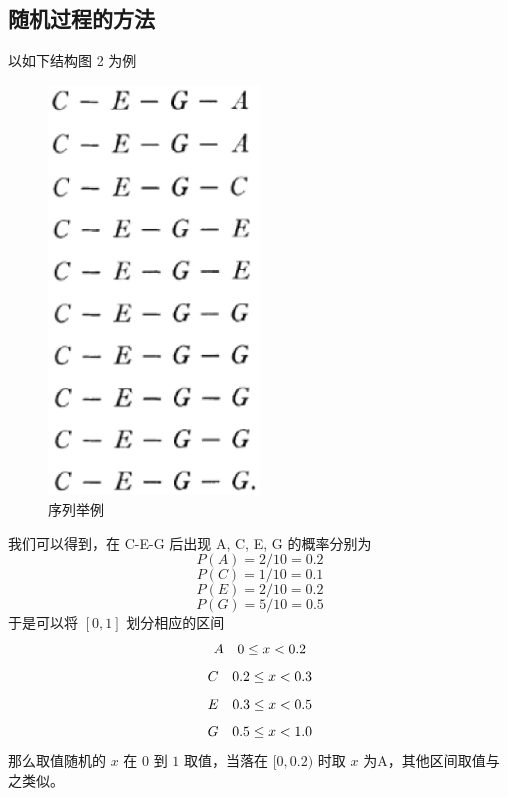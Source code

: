 \documentclass[11pt]{article}
\def\quad{\hskip1em\relax}
\begin{document}
\subsection{随机过程的方法}
以如下结构图 2 为例
\begin{figure}[hptb]
	\centering
	\label{fig:1.1.2}
	\includegraphics[width=0.5\textwidth]{pic/1.1.2.eps}
	\caption{序列举例}
\end{figure}	
我们可以得到，在 C-E-G 后出现 A, C, E, G 的概率分别为
$$ P(A) = 2/10 = 0.2 $$
$$ P(C) = 1/10 = 0.1 $$
$$ P(E) = 2/10 = 0.2 $$
$$ P(G) = 5/10 = 0.5 $$
于是可以将 $[0, 1]$ 划分相应的区间
$$ A \quad 0 \le x < 0.2 $$
$$ C \quad 0.2 \le x < 0.3 $$
$$ E \quad 0.3 \le x < 0.5 $$
$$ G \quad 0.5 \le x < 1.0 $$
那么取值随机的 $x$ 在 $0$ 到 $1$ 取值，当落在 $[0, 0.2)$ 时取 $x$ 为A，其他区间取值与之类似。
\end{document}
